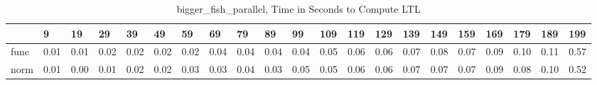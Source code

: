 \begin{table}
\centering
\caption{bigger_fish_parallel, Time in Seconds to Compute LTL}
\label{bigger_fish_parallel_LTL_time}
\begin{tabular}{lllllllllllllllllllll}
\toprule
{} &     9 &    19 &    29 &    39 &    49 &    59 &    69 &    79 &    89 &    99 &   109 &   119 &   129 &   139 &   149 &   159 &   169 &   179 &   189 &   199 \\
\midrule
func &  0.01 &  0.01 &  0.02 &  0.02 &  0.02 &  0.02 &  0.04 &  0.04 &  0.04 &  0.04 &  0.05 &  0.06 &  0.06 &  0.07 &  0.08 &  0.07 &  0.09 &  0.10 &  0.11 &  0.57 \\
norm &  0.01 &  0.00 &  0.01 &  0.02 &  0.02 &  0.03 &  0.03 &  0.04 &  0.03 &  0.05 &  0.05 &  0.06 &  0.06 &  0.07 &  0.07 &  0.07 &  0.09 &  0.08 &  0.10 &  0.52 \\
\bottomrule
\end{tabular}
\end{table}
